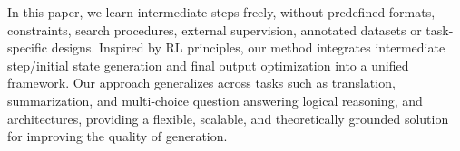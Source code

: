 
In this paper, we learn intermediate steps freely, without predefined formats, constraints, search procedures, external supervision, annotated datasets or task-specific designs.
Inspired by RL principles, our method integrates intermediate step/initial state generation and final output optimization into a unified framework. 
Our approach generalizes across tasks such as translation, summarization, and multi-choice question answering logical reasoning, and architectures, providing a flexible, scalable, and theoretically grounded solution for improving the quality of generation.




